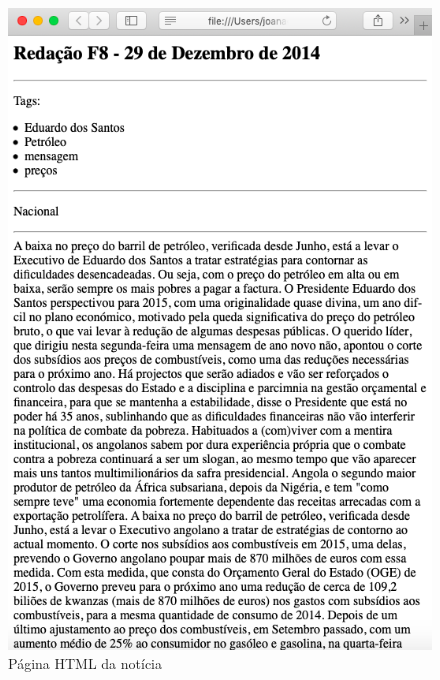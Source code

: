 \documentclass[25pt]{article}
\begin{document}
    \begin{figure}
    \centering\includegraphics[scale=0.50]{pageHTML}
    \caption{\label{fig:controller}Página HTML da notícia}
    \end{figure}
    \newpage
\end{document}
